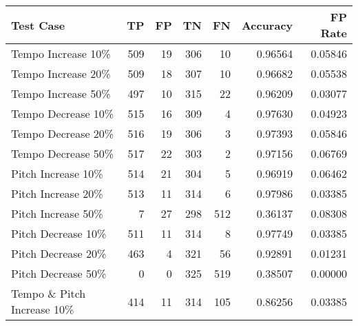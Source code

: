 \begin{table}[H]
    \begin{tabular}{|l|r|r|r|r|r|r|}
        \hline
        \textbf{Test Case}                  & \textbf{TP}   & \textbf{FP} & \textbf{TN} & \textbf{FN} & \textbf{Accuracy} & \textbf{FP Rate} \\ \hline
        Tempo Increase 10\%                & 509         & 19          & 306         & 10          & 0.96564           & 0.05846          \\ \hline
        Tempo Increase 20\%                & 509         & 18          & 307         & 10          & 0.96682           & 0.05538          \\ \hline
        Tempo Increase 50\%                & 497         & 10          & 315         & 22          & 0.96209           & 0.03077          \\ \hline
        Tempo Decrease 10\%                & 515         & 16          & 309         & 4           & 0.97630           & 0.04923          \\ \hline
        Tempo Decrease 20\%                & 516         & 19          & 306         & 3           & 0.97393           & 0.05846          \\ \hline
        Tempo Decrease 50\%                & 517         & 22          & 303         & 2           & 0.97156           & 0.06769          \\ \hline
        Pitch Increase 10\%                & 514         & 21          & 304         & 5           & 0.96919           & 0.06462          \\ \hline
        Pitch Increase 20\%                & 513         & 11          & 314         & 6           & 0.97986           & 0.03385          \\ \hline
        Pitch Increase 50\%                & 7           & 27          & 298         & 512         & 0.36137           & 0.08308          \\ \hline
        Pitch Decrease 10\%                & 511         & 11          & 314         & 8           & 0.97749           & 0.03385          \\ \hline
        Pitch Decrease 20\%                & 463         & 4           & 321         & 56          & 0.92891           & 0.01231          \\ \hline
        Pitch Decrease 50\%                & 0           & 0           & 325         & 519         & 0.38507           & 0.00000          \\ \hline
        Tempo \& Pitch Increase 10\%      & 414         & 11          & 314         & 105         & 0.86256           & 0.03385          \\ \hline

\end{tabular}
\end{table}
